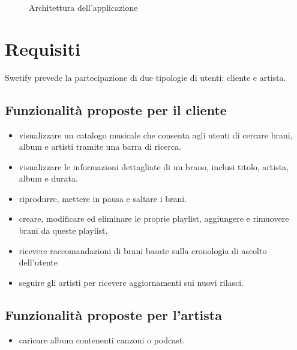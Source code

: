 \documentclass{article}
\begin{document}
  \begin{figure}[H]
    \centering
    
    \caption{Architettura dell'applicazione}
    \label{fig:architettura}
  \end{figure}


  \section{Requisiti}
  \label{sec:reqFunc}
  Swetify prevede la partecipazione di due tipologie di utenti: cliente e artista.

  \subsection{Funzionalità proposte per il cliente}

  \begin{itemize}

    \item visualizzare un catalogo musicale che consenta agli utenti di cercare brani, album e artisti tramite una barra
    di ricerca.

    \item visualizzare le informazioni dettagliate di un brano, inclusi titolo, artista, album e durata.

    \item riprodurre, mettere in pausa e saltare i brani.

    \item creare, modificare ed eliminare le proprie playlist, aggiungere e rimuovere brani da queste playlist.

    \item ricevere raccomandazioni di brani basate sulla cronologia di ascolto dell'utente

    \item seguire gli artisti per ricevere aggiornamenti sui nuovi rilasci.

  \end{itemize}

  \subsection{Funzionalità proposte per l'artista}

  \begin{itemize}

    \item caricare album contenenti canzoni o podcast.

  \end{itemize}
\end{document}
